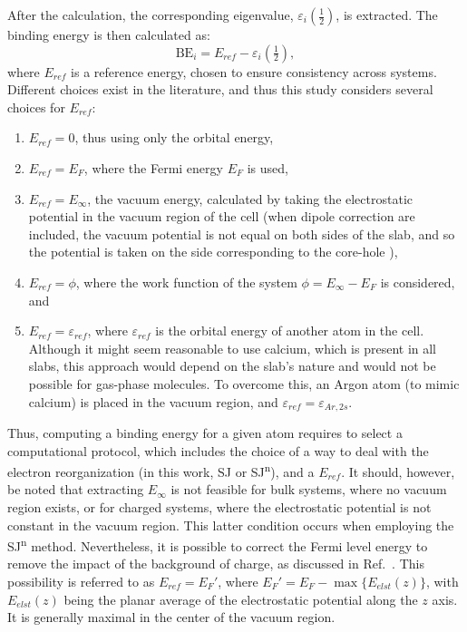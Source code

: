 \documentclass[journal=jpccck,manuscript=article]{achemso}
\begin{document}
After the calculation, the corresponding eigenvalue, $\varepsilon_i\left(\frac{1}{2}\right)$, is extracted. The binding energy is then calculated as:
\begin{equation}
	\text{BE}_i = 
	E_{ref}- \varepsilon_i\left(\tfrac{1}{2}\right), \label{eq:xpsbe}
\end{equation}
where $E_{ref}$ is a reference energy, chosen to ensure consistency across systems. Different choices exist in the literature, and thus this study considers several choices for $E_{ref}$:
\begin{enumerate}
	\item $E_{ref}=0$, thus using only the orbital energy,
	\item $E_{ref}=E_F$, where the Fermi energy $E_F$ is used, 
	\item $E_{ref}=E_\infty$, the vacuum energy, calculated by taking the electrostatic potential in the vacuum region of the cell (when dipole correction are included, the vacuum potential is not equal on both sides of the slab, and so the potential is taken on the side corresponding to the core-hole \cite{montiInfluenceElectrostaticFields2010}),
	\item $E_{ref}=\phi$, where the work function of the system $\phi = E_\infty - E_F$ is considered\cite{kahnFermiLevelWork2015}, and
	\item $E_{ref}= \varepsilon_{ref}$, where $\varepsilon_{ref}$ is the orbital energy of another atom in the cell. Although it might seem reasonable to use calcium, which is present in all slabs, this approach would depend on the slab's nature and would not be possible for gas-phase molecules. To overcome this, an Argon atom (to mimic calcium) is placed in the vacuum region, and $\varepsilon_{ref}=\varepsilon_{Ar,2s}$.
\end{enumerate}
Thus, computing a binding energy for a given atom requires to select a computational protocol, which includes the choice of a  way to deal with the electron reorganization  (in this work, SJ or SJ\textsuperscript{n}), and a $E_{ref}$.
It should, however, be noted that extracting $E_\infty$ is not feasible for bulk systems, where no vacuum region exists, or for charged systems, where the electrostatic potential is not constant in the vacuum region. This latter condition occurs when employing the SJ\textsuperscript{n} method. Nevertheless, it is possible to correct the Fermi level energy to remove the impact of the background of charge, as discussed in Ref.~. This possibility is referred to as $E_{ref}=E_F'$, where $E_F' = E_F - \max\{E_{elst}(z)\}$, with $E_{elst}(z)$ being the planar average of the electrostatic potential along the $z$ axis. It is generally maximal in the center of the vacuum region. 
\end{document}

